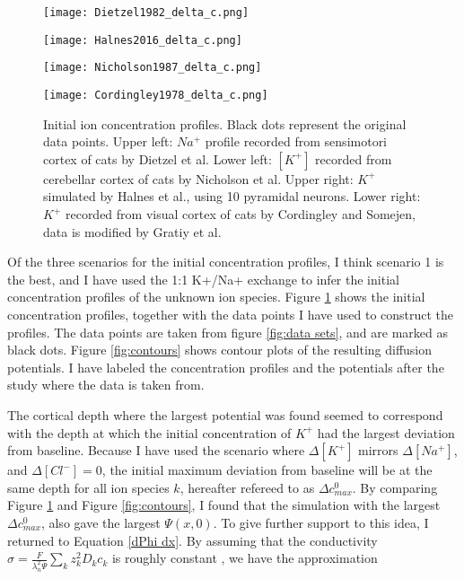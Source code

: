\documentclass{article}
\begin{document}
\begin{figure}[!tbp]
  \centering
  \begin{minipage}[b]{0.45\textwidth}
    \texttt{[image: Dietzel1982\_delta\_c.png]}
  \end{minipage}
  \hfill
  \begin{minipage}[b]{0.45\textwidth}
    \texttt{[image: Halnes2016\_delta\_c.png]}
  \end{minipage}
    \begin{minipage}[b]{0.45\textwidth}
    \texttt{[image: Nicholson1987\_delta\_c.png]}
  \end{minipage}
  \hfill
  \begin{minipage}[b]{0.45\textwidth}
    \texttt{[image: Cordingley1978\_delta\_c.png]}
  \end{minipage}
  \caption{Initial ion concentration profiles. Black dots represent the original data points. Upper left: $Na^+$ profile recorded from sensimotori cortex of cats by Dietzel et al. Lower left: $[K^+]$  recorded from cerebellar cortex of cats by Nicholson et al. Upper right:  $K^+$ simulated by Halnes et al., using 10 pyramidal neurons. Lower right: $K^+$ recorded from visual cortex of cats by Cordingley and Somejen, data is modified by Gratiy et al.}
  \label{fig:initial concentrations}
\end{figure} 
Of the three scenarios for the initial concentration profiles, I think scenario 1 is the best, and I have used the 1:1 K+/Na+ exchange to infer the initial concentration profiles of the unknown ion species. Figure \ref{fig:initial concentrations} shows the initial concentration profiles, together with the data points I have used to construct the profiles. The data points are taken from figure \ref{fig:data sets}, and are marked as black dots. Figure \ref{fig:contours} shows contour plots of the resulting diffusion potentials. I have labeled the concentration profiles and the potentials after the study where the data is taken from. 

The cortical depth where the largest potential was found seemed to correspond with the depth at which the initial concentration of $K^+$ had the largest deviation from baseline. Because I have used the scenario where $\Delta [K^+]$ mirrors $\Delta [Na^+]$, and $\Delta [Cl^-] =0$, the initial maximum deviation from baseline will be at the same depth for all ion species $k$, hereafter refereed to as $\Delta c_{max}^0$. By comparing Figure \ref{fig:initial concentrations} and Figure \ref{fig:contours}, I found that the simulation with the largest  $\Delta c_{max}^0$, also gave the largest $\Psi(x,0)$. To give further support to this idea, I returned to Equation \ref{dPhi dx}. By assuming that the conductivity $\sigma = \frac{F}{\lambda_n^2 \Psi}\sum_k z_k^2D_kc_k$ is roughly constant \cite{Halnes2016}, we have the approximation
\end{document}

